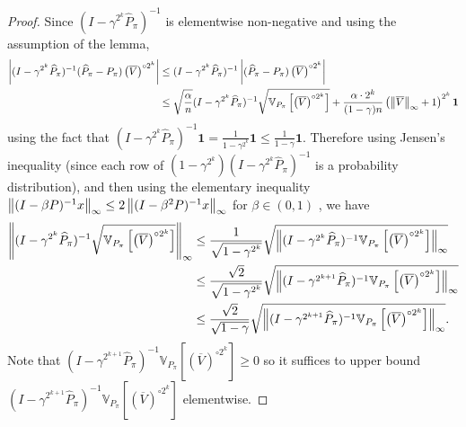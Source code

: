 \documentclass{article}
\theoremstyle{plain}
\theoremstyle{plain}
\theoremstyle{remark}
\theoremstyle{plain}
\theoremstyle{plain}
\newcommand{\Var}{\mathbb{V}}
\newcommand{\Phat}{\widehat{P}}
\newcommand{\one}{\mathbf{1}}
\newcommand{\Vc}{\overline{V}}
\begin{document}
\begin{proof}
    Since $(I - \gamma^{2^k} \Phat_{\pi})^{-1}$ is elementwise non-negative and using the assumption of the lemma,
    \begin{align}
         \left| (I - \gamma^{2^k} \Phat_{\pi})^{-1} (\Phat_{\pi} - P_\pi) \left( \Vc \right)^{\circ 2^k} \right| & \leq  (I - \gamma^{2^k} \Phat_{\pi})^{-1} \left|(\Phat_{\pi} - P_\pi) \left( \Vc \right)^{\circ 2^k} \right| \nonumber \\
         & \leq \sqrt{\frac{\alpha}{n}} (I - \gamma^{2^k} \Phat_{\pi})^{-1} \sqrt{\Var_{P_{\pi}} \left[ \left(\Vc \right)^{\circ 2^k}  \right] }+ \frac{ \alpha \cdot 2^k }{(1-\gamma) n}  \left( \infnorm{\Vc} + 1\right)^{2^k} \one \label{eq:DMDP_recursive_step_1}
    \end{align}
    using the fact that $(I - \gamma^{2^k} \Phat_{\pi})^{-1} \one = \frac{1}{1-\gamma^{2^k}} \one \leq \frac{1}{1-\gamma} \one$. 
Therefore using Jensen's inequality (since each row of $(1-\gamma^{2^k}) (I - \gamma^{2^{k}} \Phat_{\pi})^{-1}$ is a probability distribution), and then using the elementary inequality $\left\Vert (I - \beta P)^{-1}x\right\Vert _{\infty} \leq 2\left\Vert (I - \beta^2 P)^{-1}x\right\Vert _{\infty}$ for $\beta \in (0,1)$ \citep{agarwal_model-based_2020}, we have
\begin{align}
    \infnorm{(I - \gamma^{2^k} \Phat_{\pi})^{-1} \sqrt{\Var_{P_{\pi}} \left[ \left(\Vc \right)^{\circ 2^k}  \right] } }& \leq \frac{1}{\sqrt{1-\gamma^{2^k}}} \sqrt{ \infnorm{(I - \gamma^{2^k} \Phat_{\pi})^{-1}\Var_{P_{\pi}} \left[ \left(\Vc \right)^{\circ 2^k}  \right]} } \nonumber\\
    & \leq \frac{\sqrt{2}}{\sqrt{1-\gamma^{2^k}}} \sqrt{\infnorm{(I - \gamma^{2^{k+1}} \Phat_{\pi})^{-1}\Var_{P_{\pi}} \left[ \left(\Vc \right)^{\circ 2^k}  \right]} }\nonumber \\
    & \leq \frac{\sqrt{2}}{\sqrt{1-\gamma}}\sqrt{\infnorm{(I - \gamma^{2^{k+1}} \Phat_{\pi})^{-1}\Var_{P_{\pi}} \left[ \left(\Vc \right)^{\circ 2^k}  \right]} }\label{eq:DMDP_recursive_step_2}.
\end{align}
Note that $(I - \gamma^{2^{k+1}} \Phat_{\pi})^{-1}\Var_{P_{\pi}} \left[ \left(\Vc \right)^{\circ 2^k}  \right] \geq 0$ so it suffices to upper bound $(I - \gamma^{2^{k+1}} \Phat_{\pi})^{-1}\Var_{P_{\pi}} \left[ \left(\Vc \right)^{\circ 2^k}  \right]$ elementwise. 


\end{proof}
\end{document}
